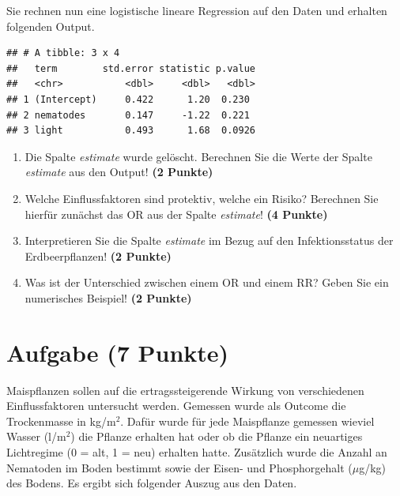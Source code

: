 \documentclass[a4paper, 10pt]{scrartcl}\usepackage[]{graphicx}\usepackage[]{xcolor}
\makeatletter
\newenvironment{kframe}{%
 \def\at@end@of@kframe{}%
 \ifinner\ifhmode%
  \def\at@end@of@kframe{\end{minipage}}%
  \begin{minipage}{\columnwidth}%
 \fi\fi%
 \def\FrameCommand##1{\hskip\@totalleftmargin \hskip-\fboxsep
 \colorbox{shadecolor}{##1}\hskip-\fboxsep
     \hskip-\linewidth \hskip-\@totalleftmargin \hskip\columnwidth}%
 \MakeFramed {\advance\hsize-\width
   \@totalleftmargin\z@ \linewidth\hsize
   \@setminipage}}%
 {\par\unskip\endMakeFramed%
 \at@end@of@kframe}
\newenvironment{knitrout}{}{} %
\makeatother
\begin{document}
Sie rechnen nun eine logistische lineare Regression auf den Daten und erhalten
folgenden \Rlogo Output.

\begin{knitrout}
\color{fgcolor}\begin{kframe}
\begin{verbatim}
## # A tibble: 3 x 4
##   term        std.error statistic p.value
##   <chr>           <dbl>     <dbl>   <dbl>
## 1 (Intercept)     0.422      1.20  0.230 
## 2 nematodes       0.147     -1.22  0.221 
## 3 light           0.493      1.68  0.0926
\end{verbatim}
\end{kframe}
\end{knitrout}


\begin{enumerate}
\item Die Spalte \textit{estimate} wurde gel{\"o}scht. Berechnen Sie die Werte
  der Spalte \textit{estimate} aus den \Rlogo Output! \textbf{(2 Punkte)}
\item Welche Einflussfaktoren sind protektiv, welche ein Risiko? Berechnen
  Sie hierf{\"u}r zun{\"a}chst das OR aus der Spalte \textit{estimate}! \textbf{(4 Punkte)}
\item Interpretieren Sie die Spalte \textit{estimate} im Bezug auf den
  Infektionsstatus der Erdbeerpflanzen! \textbf{(2 Punkte)}
\item Was ist der Unterschied zwischen einem OR und einem RR? Geben Sie ein
  numerisches Beispiel! \textbf{(2 Punkte)}
\end{enumerate}
 
\clearpage

\section{Aufgabe \hfill (7 Punkte)}



Maispflanzen sollen auf die ertragssteigerende Wirkung von verschiedenen
Einflussfaktoren untersucht werden. Gemessen wurde als Outcome die
Trockenmasse in kg/m$^2$. Daf{\"u}r wurde f{\"u}r jede Maispflanze gemessen wieviel
Wasser (l/m$^2$) die Pflanze erhalten hat oder ob die Pflanze ein
neuartiges Lichtregime (0 = alt, 1 = neu) erhalten hatte. Zus{\"a}tzlich wurde
die Anzahl an Nematoden im Boden bestimmt sowie der Eisen- und
Phosphorgehalt ($\mu$g/kg) des Bodens. Es ergibt sich folgender Auszug aus
den Daten.
\end{document}
